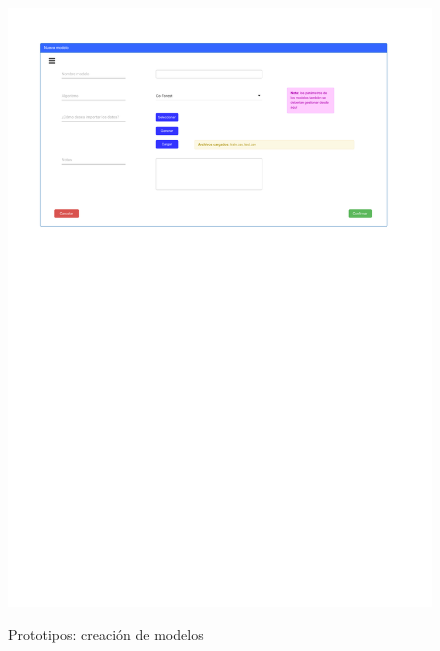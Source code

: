 \begin{figure}[h]
	\caption{Prototipos: creación de modelos}
	\centering
	\includegraphics[width=\textwidth]{../img/anexos/mockups/6-mockups-new_model}
	\label{mock:model-new}
\end{figure}

